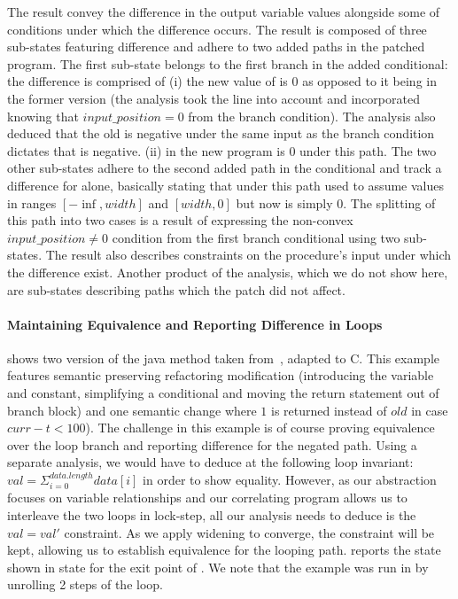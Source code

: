 The result convey the difference in the output variable values alongside some of conditions under which the difference occurs. The result is composed of three sub-states featuring difference and adhere to two added paths in the patched program. The first sub-state belongs to the first branch in the added conditional: the difference is comprised of (i) the new value of  is 0 as opposed to it being  in the former version (the analysis took the  line into account and incorporated knowing that $input\_position = 0$ from the branch condition). The analysis also deduced that the old  is negative under the same input as the branch condition dictates that  is negative. (ii)  in the new program is 0 under this path. The two other sub-states adhere to the second added path in the conditional and track a difference for  alone, basically stating that  under this path used to assume values in ranges $[-\inf,width]$ and $[width,0]$ but now is simply 0. The splitting of this path into two cases is a result of expressing the non-convex $input\_position \neq 0$ condition from the first branch conditional using two sub-states. The result also describes constraints on the procedure's input under which the difference exist. Another product of the analysis, which we do not show here, are sub-states describing paths which the patch did not affect.

\paragraph{Maintaining Equivalence and Reporting Difference in Loops}


 shows two version of the java  method taken from~\cite{DwyerElbaumPerson08}, adapted to C. This example features semantic preserving refactoring modification (introducing the  variable and  constant, simplifying a conditional and moving the return statement out of branch block) and one semantic change where $1$ is returned instead of $old$ in case $curr - t < 100$). The challenge in this example is of course proving equivalence over the loop branch and reporting difference for the negated path. Using a separate analysis, we would have to deduce at the following loop invariant: $val = \Sigma_{i=0}^{data.length}data[i]$ in order to show equality. However, as our abstraction focuses on variable relationships and our correlating program allows us to interleave the two loops in lock-step, all our analysis needs to deduce is the $val = val'$ constraint. As we apply widening to converge, the constraint will be kept, allowing us to establish equivalence for the looping path. {\tool} reports the state shown in  state for the exit point of . We note that the example was run in \cite{DwyerElbaumPerson08} by unrolling 2 steps of the loop.

